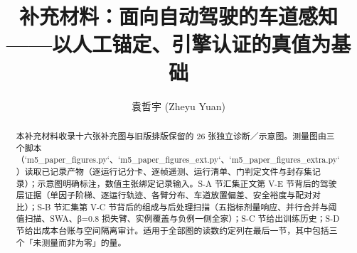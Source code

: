 \documentclass[journal]{IEEEtran}
\title{补充材料：面向自动驾驶的车道感知——以人工锚定、引擎认证的真值为基础}
\author{袁哲宇 (Zheyu Yuan)}
\begin{document}
\maketitle
\begin{abstract}
本补充材料收录十六张补充图与旧版排版保留的 26 张独立诊断／示意图。测量图由三个脚本（`m5_paper_figures.py`、`m5_paper_figures_ext.py`、`m5_paper_figures_extra.py`）读取已记录产物（逐运行记分卡、逐帧遥测、运行清单、门判定文件与封存集记录）；示意图明确标注，数值主张绑定记录输入。S-A 节汇集正文第 V-E 节背后的驾驶层证据（单因子阶梯、逐运行轨迹、各臂分布、车道放置偏差、安全裕度与配对对比）；S-B 节汇集第 V-C 节背后的组成与后处理扫描（五指标剂量响应、并行合并与阈值扫描、SWA、β=0.8 损失臂、实例覆盖与负例一侧全家）；S-C 节给出训练历史；S-D 节给出成本台账与空间隔离审计。适用于全部图的读数约定列在最后一节，其中包括三个「未测量而非为零」的量。
\end{abstract}
\end{document}
